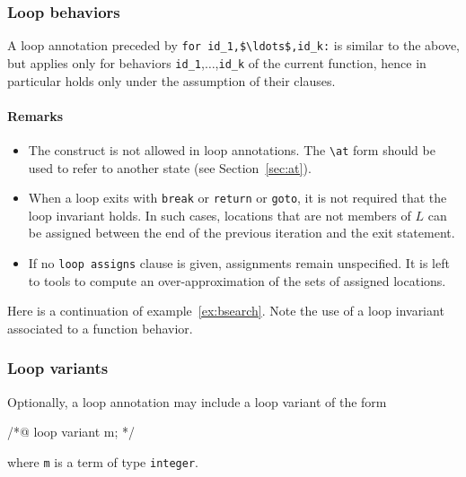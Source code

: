 \subsubsection{Loop behaviors}
A loop annotation preceded by
\lstinline|for id_1,$\ldots$,id_k:| is similar to the above, but
applies only for behaviors \lstinline|id_1|,$\ldots$,\lstinline|id_k|
of the current function, 
hence in particular holds only under the assumption of their \assumes
clauses.


\paragraph{Remarks}
\begin{itemize}
\item The \old{} construct is not allowed
  in loop annotations. The \lstinline|\at| form should be used to
  refer to another state (see Section~\ref{sec:at}).
\item When a loop exits with \lstinline{break} or \lstinline{return} or
  \lstinline{goto}, it is not required that the loop invariant holds.
  In such cases, locations that are not members of $L$ can be
  assigned between the end of the previous iteration and the exit statement.
\item If no \lstinline{loop assigns}
  clause is given, assignments remain unspecified.
  It is left to tools to compute an over-approximation of the sets
  of assigned locations.
\end{itemize}

\begin{example}
\label{ex:bsearch2}
Here is a continuation of example~\ref{ex:bsearch}. Note the use of
a loop invariant associated to a function behavior.


\end{example}

\subsubsection{Loop variants}\label{sec:loop-variant}

Optionally, a loop annotation may include a loop variant of the form
\begin{listing-nonumber}
/*@ loop variant m; */
\end{listing-nonumber}
where \lstinline|m| is a term of type \lstinline|integer|.

